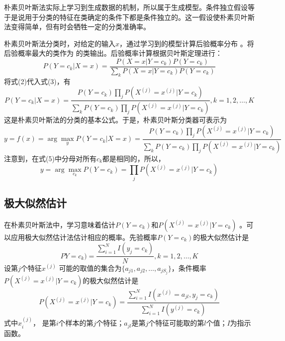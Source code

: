 \documentclass[UTF8]{ctexart}
\begin{document}
朴素贝叶斯法实际上学习到生成数据的机制，所以属于生成模型。条件独立假设等于是说用于分类的特征在类确定的条件下都是条件独立的。这一假设使朴素贝叶斯法变得简单，但有时会牺牲一定的分类准确率。

朴素贝叶斯法分类时，对给定的输入$x$，通过学习到的模型计算后验概率分布 。将后验概率最大的类作为  的类输出。后验概率计算根据贝叶斯定理进行：
\begin{equation}
	P(Y=c_k|X=x)=\frac{P(X=x|Y=c_k)P(Y=c_k)}  {  \sum\limits_k P(X=x|Y=c_k)P(Y=c_k)}
\end{equation}
将式(2)代入式(3)，有
\begin{equation}
	P(Y=c_k|X=x)=\frac{P(Y=c_k) \prod\limits_j P(X^{(j)}=x^{(j)}|Y=c_k)}  {\sum\limits_k P(Y=c_k)  \prod\limits_j P(X^{(j)}=x^{(j)}|Y=c_k)},k=1,2,\dots,K
\end{equation}
这是朴素贝叶斯法的分类的基本公式。于是，朴素贝叶斯分类器可表示为
\begin{equation}
	y = f(x) = \arg \underset{y}{\max}  P(Y=c_k|X=x)=
	\frac{P(Y=c_k) \prod\limits_j P(X^{(j)}=x^{(j)}|Y=c_k)}
	{\sum\limits_k P(Y=c_k)  \prod\limits_j P(X^{(j)}=x^{(j)}|Y=c_k)}
\end{equation}
注意到，在式(5)中分母对所有$c_k$都是相同的，所以，
\begin{equation}
	y = \arg \underset{c_k}{\max}  P(Y=c_k)=\prod\limits_j P(X^{(j)}=x^{(j)}|Y=c_k)
\end{equation}

\subsection{极大似然估计}
在朴素贝叶斯法中，学习意味着估计$P(Y=c_k)$和$P(X^{(j)}=x^{(j)}|Y=c_k)$  。可以应用极大似然估计法估计相应的概率。先验概率$P(Y=c_k)$的极大似然估计是
\begin{equation}
	PY=c_k)=\frac{  \sum^N_{i=1} I (y_j=c_k)}  { N},k=1,2,\dots,K
\end{equation}
设第$j$个特征$x^{(j)}$  可能的取值的集合为$\{a_{j1},a_{j2},\dots,a_{jS_j}\}$，条件概率$P(X^{(j)}=x^{(j)}|Y=c_k)$的极大似然估计是
\begin{equation}
	P(X^{(j)}=x^{(j)}|Y=c_k)=\frac{  \sum^N_{i=1}I(x^{(j)}=a_{jl},y_j=c_k)}  {  \sum^N_{i=1}I(y^{(j)}=c_k)}
\end{equation}
式中$x_i^{(j)}$， 是第$i$个样本的第$j$个特征；$a_{jl}$是第$j$个特征可能取的第$l$个值；$I$为指示函数。
\end{document}
